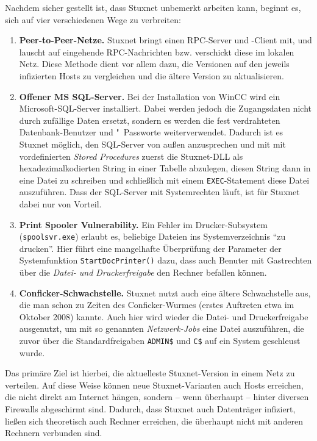 Nachdem sicher gestellt ist, dass Stuxnet unbemerkt arbeiten kann,
beginnt es, sich auf vier verschiedenen Wege zu verbreiten:

\begin{enumerate}[label=\textbf{\arabic*.}]
  \item \textbf{Peer-to-Peer-Netze.}  Stuxnet bringt einen RPC-Server
und -Client mit, und lauscht auf eingehende RPC-Nachrichten
bzw. verschickt diese im lokalen Netz. Diese Methode dient vor allem
dazu, die Versionen auf den jeweils infizierten Hosts zu vergleichen
und die ältere Version zu aktualisieren.
  
  \item \textbf{Offener MS SQL-Server.}  Bei der Installation von
WinCC wird ein Microsoft-SQL-Server installiert.  Dabei werden jedoch
die Zugangsdaten nicht durch zufällige Daten ersetzt, sondern es
werden die fest verdrahteten Datenbank-Benutzer und "~Passworte
weiterverwendet. Dadurch ist es Stuxnet möglich, den SQL-Server von
außen anzusprechen und mit mit vordefinierten \textit{Stored
Procedures} zuerst die Stuxnet-DLL als hexadezimalkodierten String in
einer Tabelle abzulegen, diesen String dann in eine Datei zu schreiben
und schließlich mit einem \texttt{EXEC}-Statement diese Datei
auszuführen. Dass der SQL-Server mit Systemrechten läuft, ist für
Stuxnet dabei nur von Vorteil.

  \item \textbf{Print Spooler Vulnerability.}  Ein Fehler im
Drucker-Subsystem (\texttt{spoolsvr.exe}) erlaubt es, beliebige
Dateien ins Systemverzeichnis \enquote{zu drucken}. Hier führt eine
mangelhafte Überprüfung der Parameter der Systemfunktion
\texttt{StartDocPrinter()} dazu, dass auch Benuter mit Gastrechten
über die \textit{Datei- und Druckerfreigabe} den Rechner befallen
können.
  
  \item \textbf{Conficker-Schwachstelle.}  Stuxnet nutzt auch eine
ältere Schwachstelle aus, die man schon zu Zeiten des Conficker-Wurmes
(erstes Auftreten etwa im Oktober 2008) kannte. Auch hier wird wieder
die Datei- und Druckerfreigabe ausgenutzt, um mit so genannten
\textit{Netzwerk-Jobs} eine Datei auszuführen, die zuvor über die
Standardfreigaben \texttt{ADMIN\$} und \texttt{C\$} auf ein System
geschleust wurde.
\end{enumerate}

Das primäre Ziel ist hierbei, die aktuelleste Stuxnet-Version in einem
Netz zu verteilen. Auf diese Weise können neue Stuxnet-Varianten auch
Hosts erreichen, die nicht direkt am Internet hängen, sondern -- wenn
überhaupt -- hinter diversen Firewalls abgeschirmt sind. Dadurch, dass
Stuxnet auch Datenträger infiziert, ließen sich theoretisch auch
Rechner erreichen, die überhaupt nicht mit anderen Rechnern verbunden
sind.

